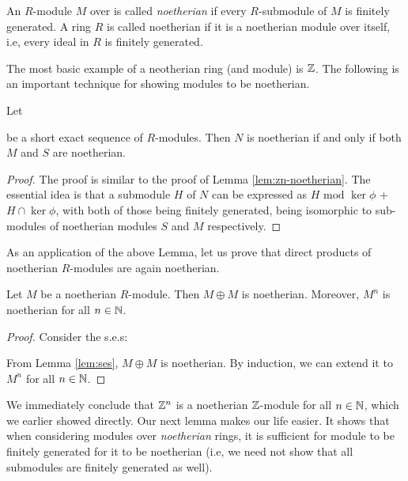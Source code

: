\documentclass[11pt]{article}
\begin{document}
\begin{definition}\label{defn:noetherian}
An $R$-module $M$ over is called {\em noetherian} if every $R$-submodule of $M$ is finitely generated. A ring
$R$ is called noetherian if it is a noetherian module over itself, i.e, every ideal in $R$ is finitely generated.
\end{definition}

The most basic example of a neotherian ring (and module) is $\mathbb{Z}$. The following is an important technique for
showing modules to be noetherian.

\begin{lemma}\label{lem:ses}
Let

be a short exact sequence of $R$-modules. Then $N$ is noetherian if and only if both $M$  and $S$ are
noetherian.
\end{lemma}
\begin{proof}
The proof is similar to the proof of Lemma \ref{lem:zn-noetherian}. The essential idea is that a submodule
$H$ of $N$ can be expressed as $H \textrm{ mod } \ker{\phi}$ + $H\cap \ker{\phi}$, with both of those being
finitely generated, being isomorphic to sub-modules of noetherian modules $S$ and $M$ respectively.
\end{proof}

As an application of the above Lemma, let us prove that direct products of noetherian $R$-modules are again
noetherian.

\begin{lemma}\label{lem:direct-product-noetherian}
Let $M$ be a noetherian $R$-module. Then $M\oplus M$ is noetherian. Moreover, $M^n$ is noetherian for all
$n\in \mathbb{N}$.
\end{lemma}
\begin{proof}
Consider the s.e.s:
From Lemma \ref{lem:ses}, $M\oplus M$ is noetherian. By induction, we can extend it to $M^n$ for all $n\in \mathbb{N}$.
\end{proof}
We immediately conclude that $\mathbb{Z}^n$ is a noetherian $\mathbb{Z}$-module for all $n\in \mathbb{N}$, which we earlier showed directly.
Our next lemma makes our life easier. It shows that when considering modules over {\em noetherian} rings, it is
sufficient for module to be finitely generated for it to be noetherian (i.e, we need not show that all submodules
are finitely generated as well).
\end{document}
